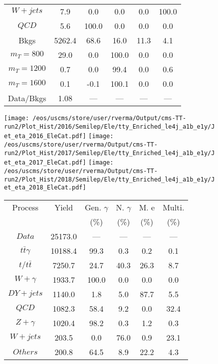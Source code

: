 \begin{figure}
\begin{minipage}[c]{0.32\textwidth}
{\begin{tabular}{cccccc}
$ W+jets $ &  7.9 &  0.0 &  0.0 &  0.0 &  100.0\\
$ QCD $ &  5.6 &  100.0 &  0.0 &  0.0 &  0.0\\
Bkgs &  5262.4 &  68.6 &  16.0 &  11.3 &  4.1\\
$ m_{T} = 800 $ &  29.0 &  0.0 &  100.0 &  0.0 &  0.0\\
$ m_{T} = 1200 $ &  0.7 &  0.0 &  99.4 &  0.0 &  0.6\\
$ m_{T} = 1600 $ &  0.1 &  -0.1 &  100.1 &  0.0 &  0.0\\
Data/Bkgs &  1.08 &  --- &  --- &  --- &  ---\\
\hline
\end{tabular}
}
\end{minipage}
\end{figure}

\begin{figure}
\centering
\texttt{[image: /eos/uscms/store/user/rverma/Output/cms-TT-run2/Plot\_Hist/2016/Semilep/Ele/tty\_Enriched\_le4j\_a1b\_e1y/Jet\_eta\_2016\_EleCat.pdf]}
\texttt{[image: /eos/uscms/store/user/rverma/Output/cms-TT-run2/Plot\_Hist/2017/Semilep/Ele/tty\_Enriched\_le4j\_a1b\_e1y/Jet\_eta\_2017\_EleCat.pdf]}
\texttt{[image: /eos/uscms/store/user/rverma/Output/cms-TT-run2/Plot\_Hist/2018/Semilep/Ele/tty\_Enriched\_le4j\_a1b\_e1y/Jet\_eta\_2018\_EleCat.pdf]}
\begin{minipage}[c]{0.32\textwidth}
\centering
\tiny{
\begin{tabular}{cccccc}
\hline
Process & Yield & Gen. $\gamma$ & N. $\gamma$ & M. e & Multi. \\
 &  & (\%) & (\%) & (\%) & (\%)  \\
\hline
                                                                      $ Data $ &  25173.0 &  --- &  --- &  --- &  ---\\
$ t\bar{t}\gamma $ &  10188.4 &  99.3 &  0.3 &  0.2 &  0.1\\
$ t/t\bar{t} $ &  7250.7 &  24.7 &  40.3 &  26.3 &  8.7\\
$ W+\gamma $ &  1933.7 &  100.0 &  0.0 &  0.0 &  0.0\\
$ DY+jets $ &  1140.0 &  1.8 &  5.0 &  87.7 &  5.5\\
$ QCD $ &  1082.3 &  58.4 &  9.2 &  0.0 &  32.4\\
$ Z+\gamma $ &  1020.4 &  98.2 &  0.3 &  1.2 &  0.3\\
$ W+jets $ &  203.5 &  0.0 &  76.0 &  0.9 &  23.1\\
$ Others $ &  200.8 &  64.5 &  8.9 &  22.2 &  4.3\\

\end{tabular}}
\end{minipage}
\end{figure}
